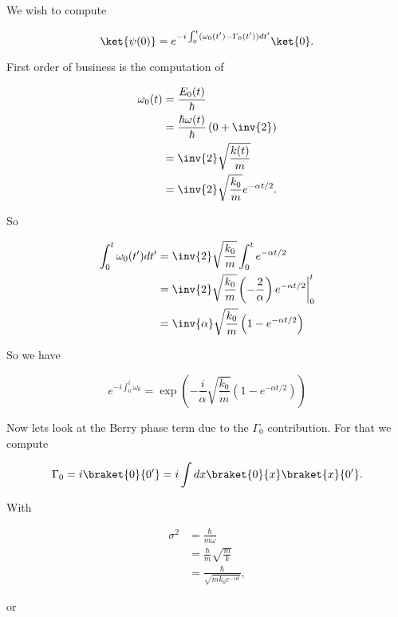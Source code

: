 We wish to compute

\begin{equation}\label{eqn:qmTwoExamReflection:770}
\ket{\psi(0)} = e^{-i \int_0^t (\omega_0(t') - \Gamma_0(t')) dt'} \ket{0}.
\end{equation}

First order of business is the computation of

\begin{align*}
\omega_0(t) 
&= \frac{E_0(t)}{\hbar} \\
&= \frac{\hbar \omega(t)}{\hbar}\left( 0 + \inv{2} \right) \\
&= \inv{2} \sqrt{\frac{k(t)}{m}} \\
&= \inv{2} \sqrt{\frac{k_0}{m}} e^{-\alpha t/2}.
\end{align*}

So

\begin{align*}
\int_0^t \omega_0(t') dt'
&= 
\inv{2} \sqrt{\frac{k_0}{m}} 
\int_0^t e^{-\alpha t/2} \\
&= 
\inv{2} \sqrt{\frac{k_0}{m}} 
{\left.{ \left(-\frac{2}{\alpha}\right) e^{-\alpha t/2} }\right\vert}_0^t \\
&= 
\inv{\alpha} \sqrt{\frac{k_0}{m}} 
\left( 1 - e^{-\alpha t/2} \right)
\end{align*}

So we have

\begin{equation}\label{eqn:qmTwoExamReflection:790}
e^{-i \int_0^t \omega_0}
=
\exp\left(
- \frac{i}{\alpha} \sqrt{\frac{k_0}{m}} 
\left( 1 - e^{-\alpha t/2} \right)
\right)
\end{equation}

Now lets look at the Berry phase term due to the $\Gamma_0$ contribution.  For that we compute

\begin{equation}\label{eqn:qmTwoExamReflection:850}
\Gamma_0 
= i \braket{0}{0'} 
= i \int dx \braket{0}{x} \braket{x}{0'}.
\end{equation}

With

\begin{align*}
\sigma^2 
&= \frac{\hbar}{m \omega} \\
&= \frac{\hbar}{m} \sqrt{\frac{m}{k}} \\
&= \frac{\hbar}{ \sqrt{m k_0 e^{-\alpha t} } },
\end{align*}

or


